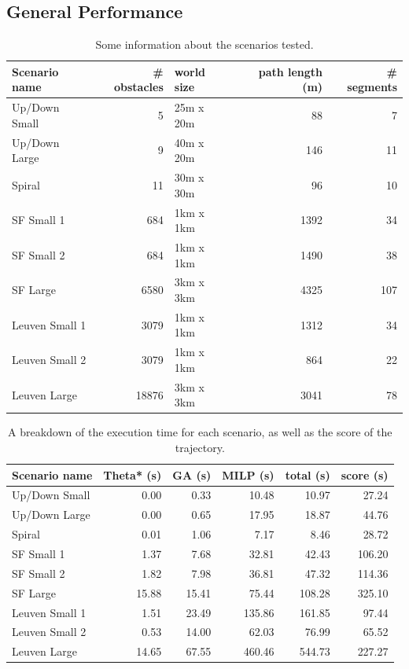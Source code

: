 \clearpage
\subsection{General Performance}
\label{subsec:gen-perf}
\begin{table}[]
\centering
\begin{tabular}{ l | r | l | r | r}
Scenario name & \# obstacles & world size & path length (m)  & \# segments \\
\hline
Up/Down Small 	& 5 	& 25m x 20m 	& 88 	& 7   \\ 
Up/Down Large 	& 9 	& 40m x 20m 	& 146 	& 11  \\
Spiral		 	& 11 	& 30m x 30m 	& 96 	& 10  \\
SF Small 1		& 684 	& 1km x 1km 	& 1392 	& 34  \\
SF Small 2		& 684 	& 1km x 1km 	& 1490 	& 38  \\
SF Large	 	& 6580 	& 3km x 3km 	& 4325 	& 107 \\
Leuven Small 1 	& 3079 	& 1km x 1km 	& 1312 	& 34  \\
Leuven Small 2	& 3079 	& 1km x 1km 	& 864 	& 22  \\
Leuven Large 	& 18876	& 3km x 3km 	& 3041 	& 78  \\
\end{tabular}
\caption{Some information about the scenarios tested.}
\label{table:gen-data}
\end{table}

\begin{table}[]
\centering
\begin{tabular}{ l | r | r | r | r || r}
Scenario name & Theta* (s) & GA (s) & MILP (s)  & total (s) & score (s) \\
\hline
Up/Down Small 	& 0.00 	& 0.33 	& 10.48 	& 10.97 	& 27.24	\\ 
Up/Down Large 	& 0.00 	& 0.65 	& 17.95 	& 18.87 	& 44.76	\\
Spiral		 	& 0.01 	& 1.06	& 7.17		& 8.46 		& 28.72	\\
SF Small 1		& 1.37 	& 7.68 	& 32.81 	& 42.43 	& 106.20\\
SF Small 2		& 1.82 	& 7.98	& 36.81 	& 47.32 	& 114.36\\
SF Large	 	& 15.88	& 15.41	& 75.44 	& 108.28 	& 325.10\\
Leuven Small 1 	& 1.51 	& 23.49	& 135.86	& 161.85	& 97.44	\\
Leuven Small 2	& 0.53 	& 14.00	& 62.03 	& 76.99 	& 65.52	\\
Leuven Large 	& 14.65	& 67.55	& 460.46 	& 544.73 	& 227.27\\
\end{tabular}
\caption{A breakdown of the execution time for each scenario, as well as the score of the trajectory.}
\label{table:gen-results}
\end{table}

